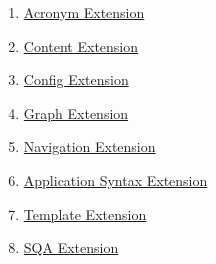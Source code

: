 \begin{enumerate}
\item 
\par \hyperref[acronym-extension]{Acronym Extension} 
\item 
\par \hyperref[content-extension]{Content Extension} 
\item 
\par \hyperref[config-extension]{Config Extension} 
\item 
\par \hyperref[graph-extension]{Graph Extension} 
\item 
\par \hyperref[navigation-extension]{Navigation Extension} 
\item 
\par \hyperref[application-syntax-extension]{Application Syntax Extension} 
\item 
\par \hyperref[template-extension]{Template Extension} 
\item 
\par \hyperref[sqa-extension]{SQA Extension}
\end{enumerate}
